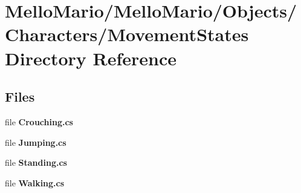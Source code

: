 \section{Mello\+Mario/\+Mello\+Mario/\+Objects/\+Characters/\+Movement\+States Directory Reference}
\label{dir_e0d0734601af053b5e9f04c71d20073a}
\subsection*{Files}
\begin{DoxyCompactItemize}
\item 
file \textbf{ Crouching.\+cs}
\item 
file \textbf{ Jumping.\+cs}
\item 
file \textbf{ Standing.\+cs}
\item 
file \textbf{ Walking.\+cs}
\end{DoxyCompactItemize}
